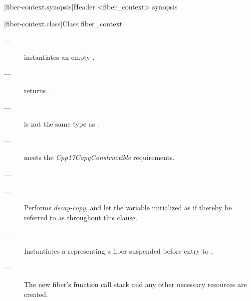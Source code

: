 [fiber-context.synopsis]{Header <fiber\_context> synopsis}


[fiber-context.class]{Class fiber\_context}


\newcommand{\state}{\cpp{state}}

\label{constructor}

\effects
\begin{description}
    \item[---] instantiates an empty \fiber.
\end{description}

\postcond
\begin{description}
    \item[---] \emptyfn returns \true.
\end{description}


\constraints
\begin{description}
    \item[---]  is not the same type as \fiber.
\end{description}

\mandates
\begin{description}
    \item[---]  meets the \emph{Cpp17CopyConstructible} requirements.
    \item[---] 
\end{description}

\effects
\begin{description}
    \item[---] Performs \emph{decay-copy}, and let the variable initialized as if thereby be referred to as  throughout this clause.
    \item[---] Instantiates a \fiber representing a fiber suspended before
              entry to .
    \item[---] The new fiber's function call stack and any other necessary
              resources are created.
\end{description}

